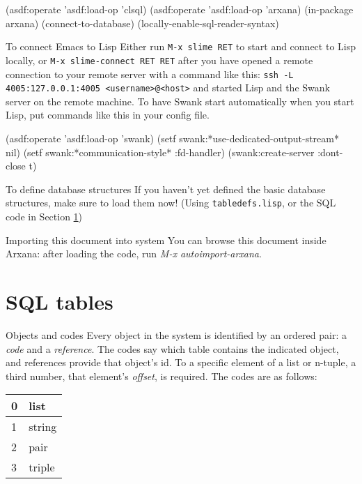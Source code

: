 \begin{idea}
(asdf:operate 'asdf:load-op 'clsql)
(asdf:operate 'asdf:load-op 'arxana)
(in-package arxana)
(connect-to-database)
(locally-enable-sql-reader-syntax)
\end{idea}

\begin{notate}{To connect Emacs to Lisp}
Either run {\tt M-x slime RET} to start and connect to
Lisp locally, or {\tt M-x slime-connect RET RET} after you
have opened a remote connection to your remote server with
a command like this: {\tt ssh -L 4005:127.0.0.1:4005
  <username>@<host>} and started Lisp and the Swank server
on the remote machine.  To have Swank start automatically
when you start Lisp, put commands like this in your config
file.
\end{notate}

\begin{idea}
(asdf:operate 'asdf:load-op 'swank)
(setf swank:*use-dedicated-output-stream* nil)
(setf swank:*communication-style* :fd-handler)
(swank:create-server :dont-close t)
\end{idea}

\begin{notate}{To define database structures}
If you haven't yet defined the basic database structures,
make sure to load them now!  (Using {\tt tabledefs.lisp},
or the SQL code in Section \ref{sql-code})
\end{notate}

\begin{notate}{Importing this document into system}
You can browse this document inside Arxana: after loading
the code, run \emph{M-x autoimport-arxana}.
\end{notate}

\section{SQL tables} \label{sql-code}

\begin{notate}{Objects and codes} \label{objects-and-codes}
Every object in the system is identified by an ordered
pair: a \emph{code} and a \emph{reference}.  The codes say
which table contains the indicated object, and references
provide that object's id.  To a specific element of a list
or n-tuple, a third number, that element's \emph{offset},
is required.  The codes are as follows:

\begin{center}
\begin{tabular}{|l|l|}
\hline
0 & list \\ \hline
1 & string \\ \hline
2 & pair \\ \hline
3 & triple \\ \hline
\end{tabular}
\end{center}
\end{notate}

